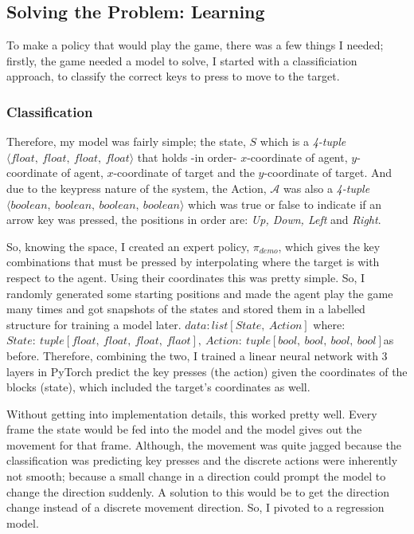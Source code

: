 \subsection{Solving the Problem: Learning}
To make a policy that would play the game, there was a few things I needed; firstly, the game needed a model to solve, I started with a classificiation approach, to classify the correct keys to press to move to the target.


\subsubsection{Classification}
Therefore, my model was fairly simple; the state, $S$ which is a \emph{4-tuple} $\langle float,~float,~float,~float \rangle$ that holds -in order- $x$-coordinate of agent, $y$-coordinate of agent, $x$-coordinate of target and the $y$-coordinate of target. And due to the keypress nature of the system, the Action, $\mathcal{A}$ was also a \emph{4-tuple} $\langle boolean,~boolean,~boolean,~boolean \rangle$ which was true or false to indicate if an arrow key was pressed, the positions in order are: \emph{Up, Down, Left} and \emph{Right}.

So, knowing the space, I created an expert policy, \(\pi_{demo}\), which gives the key combinations that must be pressed by interpolating where the target is with respect to the agent. Using their coordinates this was pretty simple. So, I randomly generated some starting positions and made the agent play the game many times and got snapshots of the states and stored them in a labelled structure for training a model later. \(data: list\left[State,~Action\right]\) where:\(
  State:~tuple\left[float,~float,~float,~flaot\right], 
  ~Action:~tuple\left[bool,~bool,~bool,~bool\right]
\)as before. Therefore, combining the two, I trained a linear neural network with 3 layers in PyTorch \cite{pytorch} predict the key presses (the action) given the coordinates of the blocks (state), which included the target's coordinates as well.

Without getting into implementation details, this worked pretty well. Every frame the state would be fed into the model and the model gives out the movement for that frame. Although, the movement was quite jagged because the classification was predicting key presses and the discrete actions were inherently not smooth; because a small change in a direction could prompt the model to change the  direction suddenly. A solution to this would be to get the direction change instead of a discrete movement direction. So, I pivoted to a regression model.


